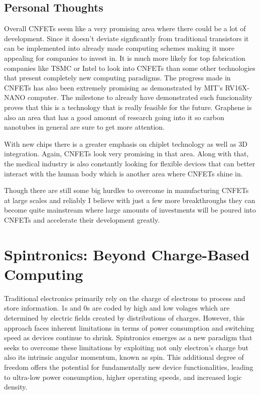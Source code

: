 \documentclass[sigconf]{acmart}
\begin{document}
\subsection{Personal Thoughts}
Overall CNFETs seem like a very promising area where there could be 
a lot of development. Since it doesn't deviate signficantly from 
traditional transistors it can be implemented into already made 
computing schemes making it more appealing for companies to invest 
in. It is much more likely for top fabrication companies like 
TSMC or Intel to look into CNFETs than some other technologies
that present completely new computing paradigms. The progress made in 
CNFETs has also been extremely promising as demonstrated by MIT's 
RV16X-NANO computer. The milestone to already have demonstrated 
such funcionality proves that this is a technology that is really 
feasible for the future. Graphene is also an area that has a good 
amount of research going into it so carbon nanotubes in general 
are sure to get more attention. 

With new chips there is a greater emphasis on chiplet technology 
as well as 3D integration. Again, CNFETs look very promising in that
area. Along with that, the medical industry is also constantly looking 
for flexible devices that can better interact with the human body 
which is another area where CNFETs shine in. 

Though there are still some big hurdles to overcome in manufacturing 
CNFETs at large scales and reliably I believe with just a few more 
breakthroughs they can become quite mainstream where large amounts 
of investments will be poured into CNFETs and accelerate their development 
greatly. 

\section{Spintronics: Beyond Charge-Based Computing}
Traditional electronics primarily rely on the charge of electrons 
to process and store information. 1s and 0s are coded by high and 
low volages which are determined by electric fields created by
distributions of charges. However, this approach faces inherent 
limitations in terms of power consumption and switching speed as 
devices continue to shrink. Spintronics emerges as a new paradigm 
that seeks to overcome these limitations by exploiting not only electron's 
charge but also its intrinsic angular momentum, known as spin. 
This additional degree of freedom offers the potential for 
fundamentally new device functionalities, leading to 
ultra-low power consumption, higher operating speeds, and increased 
logic density.
\end{document}
